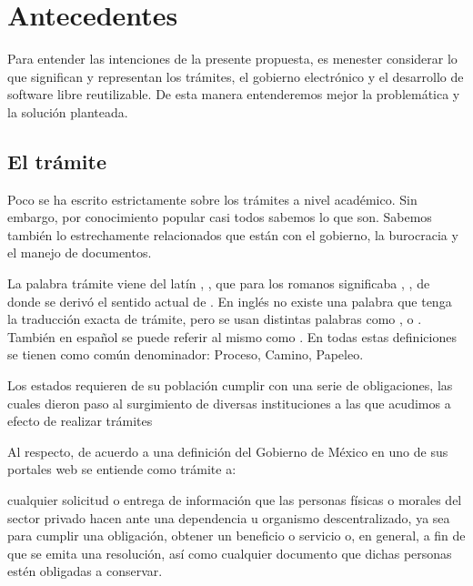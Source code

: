 \section{Antecedentes}

Para entender las intenciones de la presente propuesta, es menester considerar lo que significan y representan los trámites, el gobierno electrónico y el desarrollo de software libre reutilizable. De esta manera entenderemos mejor la problemática y la solución planteada.

\subsection{El trámite}

Poco se ha escrito estrictamente sobre los trámites a nivel académico. Sin embargo, por conocimiento popular casi todos sabemos lo que son. Sabemos también lo estrechamente relacionados que están con el gobierno, la burocracia y el manejo de documentos.

La palabra trámite viene del latín , , que para los romanos significaba , , de donde se derivó el sentido actual de . En inglés no existe una palabra que tenga la traducción exacta de trámite, pero se usan distintas palabras como 
,  o . También en español se puede referir al mismo como . En todas estas definiciones se tienen como común denominador: Proceso, Camino, Papeleo.

Los estados requieren de su población cumplir con una serie de obligaciones, las cuales dieron paso al surgimiento de diversas instituciones a las que acudimos a efecto de realizar trámites

Al respecto, de acuerdo a una definición del Gobierno de México en uno de sus portales web se entiende como trámite a:

\begin{displayquote}
    cualquier solicitud o entrega de información que las personas físicas o morales del sector privado hacen ante una dependencia u organismo descentralizado, ya sea para cumplir una obligación, obtener un beneficio o servicio o, en general, a fin de que se emita una resolución, así como cualquier documento que dichas personas estén obligadas a conservar.
\end{displayquote}

